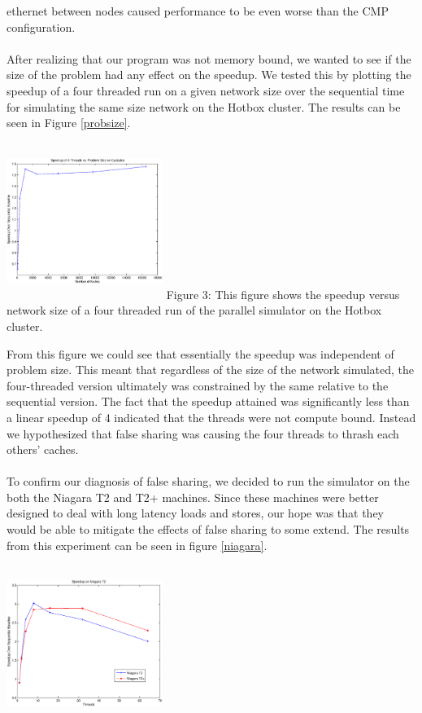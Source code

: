 \documentclass{article}
\begin{document}
\begin{multicols}{2}
ethernet between nodes caused performance to be even worse than the CMP
configuration.\\
~\\
After realizing that our program was not memory bound, we wanted to see if
the size of the problem had any effect on the speedup.  We tested this by
plotting the speedup of a four threaded run on a given network size over the
sequential time for simulating the same size network on the Hotbox
cluster.  The results can be seen in Figure \ref{probsize}.
\begin{center}
\includegraphics[height=2in,width=2in]{probsize.eps}
\small{Figure 3: This figure shows the speedup versus network size of a
four threaded run of the parallel simulator on the Hotbox cluster.}
\end{center}
From this figure we could see that essentially the speedup was independent
of problem size.  This meant that regardless of the size of the network
simulated, the four-threaded version ultimately was constrained by the
same relative to the sequential version.  The fact that the speedup
attained was significantly less than a linear speedup of 4 indicated that
the threads were not compute bound.  Instead we hypothesized that false
sharing was causing the four threads to thrash each others' caches.\\
~\\
To confirm our diagnosis of false sharing, we decided to run the simulator
on the both the Niagara T2 and T2+ machines.  Since these machines were
better designed to deal with long latency loads and stores, our hope was
that they would be able to mitigate the effects of false sharing to some
extend.  The results from this experiment can be seen in figure
\ref{niagara}.
\begin{center}
\includegraphics[height=2in,width=2in]{niagara.eps}

\end{center}
\end{multicols}
\end{document}
